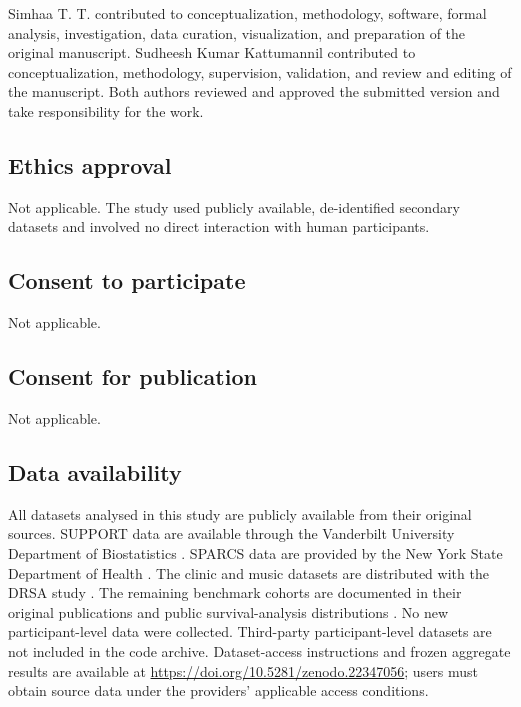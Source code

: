 \documentclass[smallextended,natbib]{svjour3}
\begin{document}
Simhaa T. T. contributed to conceptualization, methodology, software, formal analysis, investigation, data curation, visualization, and preparation of the original manuscript. Sudheesh Kumar Kattumannil contributed to conceptualization, methodology, supervision, validation, and review and editing of the manuscript. Both authors reviewed and approved the submitted version and take responsibility for the work.

\subsection*{Ethics approval}

Not applicable. The study used publicly available, de-identified secondary datasets and involved no direct interaction with human participants.

\subsection*{Consent to participate}

Not applicable.

\subsection*{Consent for publication}

Not applicable.

\subsection*{Data availability}

All datasets analysed in this study are publicly available from their original sources. SUPPORT data are available through the Vanderbilt University Department of Biostatistics \citep{support1995,vanderbiltSupport2026}. SPARCS data are provided by the New York State Department of Health \citep{nysdoh2012sparcs}. The clinic and music datasets are distributed with the DRSA study \citep{ren2019drsa}. The remaining benchmark cohorts are documented in their original publications and public survival-analysis distributions \citep{kvamme2019pycox,curtis2012metabric,dispenzieri2012flchain,breslow1999nwtco,foekens2000rotterdam,schumacher1994gbsg,katzman2018deepsurv}. No new participant-level data were collected. Third-party participant-level datasets are not included in the code archive. Dataset-access instructions and frozen aggregate results are available at \url{https://doi.org/10.5281/zenodo.22347056}; users must obtain source data under the providers' applicable access conditions.
\end{document}
